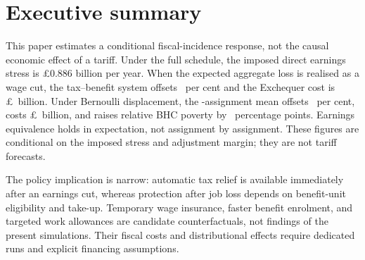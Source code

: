 \section*{Executive summary}

This paper estimates a conditional fiscal-incidence response, not the causal
economic effect of a tariff. Under the full schedule, the imposed direct
earnings stress is \pounds0.886 billion per year. When the expected aggregate
loss is realised as a wage cut, the tax--benefit system offsets
\FullWageCushion\ per cent and the Exchequer cost is
\pounds\FullWageExchequer\ billion. Under Bernoulli displacement, the
\ProductionDraws-assignment mean offsets \FullDisplacedCushion\ per cent,
costs \pounds\FullDisplacedExchequer\ billion, and raises relative BHC poverty
by \FullDisplacedPoverty\ percentage points. Earnings equivalence holds in
expectation, not assignment by assignment. These figures are conditional on
the imposed stress and adjustment margin; they are not tariff forecasts.

The policy implication is narrow: automatic tax relief is
available immediately after an earnings cut, whereas protection after job loss
depends on benefit-unit eligibility and take-up. Temporary wage insurance,
faster benefit enrolment, and targeted work allowances are candidate
counterfactuals, not findings of the present simulations. Their fiscal costs
and distributional effects require dedicated runs and explicit financing
assumptions.
